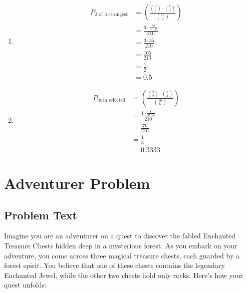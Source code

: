 \documentclass[a4paper, 10pt]{article}
\begin{document}
\begin{enumerate}[label=(\alph*)]
                \item
                \[
                    \begin{aligned}
                        P_{2 \text{ of 3 strongest}} &= \left( \frac{\binom{3}{2} \cdot \binom{7}{4}}{\binom{10}{6}} \right) \\
                        &= \frac{3 \cdot \frac{7!}{4! \cdot 3!}}{210} \\
                        &= \frac{3 \cdot 35}{210} \\
                        &= \frac{105}{210} \\
                        &= \frac{1}{2} \\
                        &= \boxed{0.5}
                    \end{aligned}
                \]

                \item
                \[
                    \begin{aligned}
                        P_{\text{both selected}} &= \left( \frac{\binom{2}{2} \cdot \binom{8}{4}}{\binom{10}{6}} \right) \\
                        &= \frac{1 \cdot \frac{8!}{4! \cdot 4!}}{210} \\
                        &= \frac{70}{210} \\
                        &= \frac{1}{3} \\
                        &= \boxed{0.3333}
                    \end{aligned}
                \]
            \end{enumerate}

    \pagebreak
    
    \section{Adventurer Problem}
        \subsection{Problem Text}
            \noindent Imagine you are an adventurer on a quest to discover the fabled Enchanted Treasure Chests hidden deep in a mysterious forest. As you embark on your adventure, you come across three magical treasure chests, each guarded by a forest spirit. You believe that one of these chests contains the legendary Enchanted Jewel, while the other two chests hold only rocks. Here's how your quest unfolds:
\end{document}
